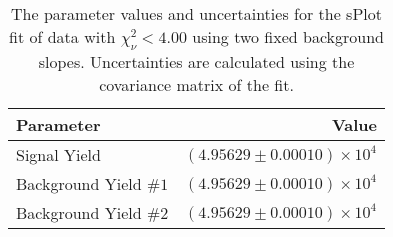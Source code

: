 
\begin{table}[ht]
    \begin{center}
        \begin{tabular}{lr}\toprule
            Parameter & Value \\\midrule
            Signal Yield & $(4.95629 \pm 0.00010) \times 10^{4}$ \\
            Background Yield $\#1$ & $(4.95629 \pm 0.00010) \times 10^{4}$ \\
            Background Yield $\#2$ & $(4.95629 \pm 0.00010) \times 10^{4}$ \\\bottomrule
        \end{tabular}
        \caption{The parameter values and uncertainties for the sPlot fit of data with $\chi^2_\nu < 4.00$ using two fixed background slopes. Uncertainties are calculated using the covariance matrix of the fit.}\label{tab:splot-fit-results-chisqdof-4.00-fixed-2}
    \end{center}
\end{table}
